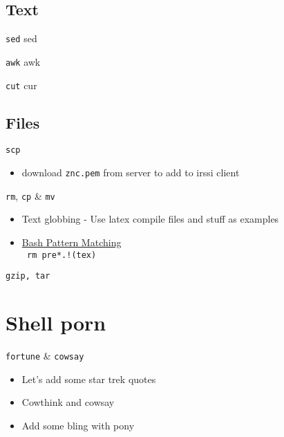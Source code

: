 \documentclass[11pt]{beamer}
\begin{document}
		\subsection{Text}
			\begin{frame}{ \texttt{sed}}
				sed
			\end{frame}
			\begin{frame}{ \texttt{awk}}
				awk
			\end{frame}
			\begin{frame}{ \texttt{cut}}
				cur
			\end{frame}

		\subsection{Files}
			\begin{frame}{ \texttt{scp}}
				\begin{itemize}
					\item download \texttt{znc.pem} from server to add to irssi client
				\end{itemize}			
			\end{frame}
			\begin{frame}{ \texttt{rm}, \texttt{cp} \& \texttt{mv}}
				\begin{itemize}
					\item Text globbing - Use latex compile files and stuff as examples
					\item \href{https://www.gnu.org/software/bash/manual/bashref.html#Pattern-Matching}{Bash Pattern Matching} \\
						\texttt{ rm pre*.!(tex) }
				\end{itemize}	
			\end{frame}
			\begin{frame}{ \texttt{gzip, tar}}
				
			\end{frame}

	\section{Shell porn}
		\begin{frame}{\texttt{fortune} \& \texttt{cowsay}}
			\begin{itemize}
				\item Let's add some star trek quotes
				\item Cowthink and cowsay
				\item Add some bling with pony
			\end{itemize}
		\end{frame}
\end{document}
